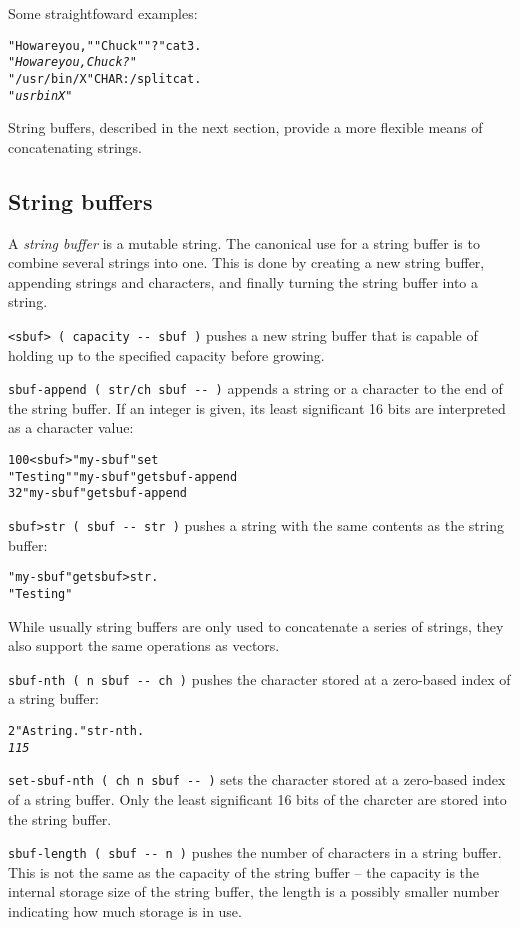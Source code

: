 \documentclass[english]{article}
\begin{document}
Some straightfoward examples:

\begin{alltt}
"How are you, " "Chuck" "?" cat3 .
\emph{"How are you, Chuck?"}
"/usr/bin/X" CHAR: / split cat .
\emph{"usrbinX"}
\end{alltt}
String buffers, described in the next section, provide a more flexible
means of concatenating strings.


\subsection{String buffers}

A \emph{string buffer} is a mutable string. The canonical use for
a string buffer is to combine several strings into one. This is done
by creating a new string buffer, appending strings and characters,
and finally turning the string buffer into a string.

\texttt{<sbuf> ( capacity -{}- sbuf )} pushes a new string buffer
that is capable of holding up to the specified capacity before growing.

\texttt{sbuf-append ( str/ch sbuf -{}- )} appends a string or a character
to the end of the string buffer. If an integer is given, its least significant
16 bits are interpreted as a character value:

\begin{alltt}
100 <sbuf> "my-sbuf" set
"Testing" "my-sbuf" get sbuf-append
32 "my-sbuf" get sbuf-append
\end{alltt}
\texttt{sbuf>str ( sbuf -{}- str )} pushes a string with the same
contents as the string buffer:

\begin{alltt}
"my-sbuf" get sbuf>str .
"Testing "
\end{alltt}
While usually string buffers are only used to concatenate a series
of strings, they also support the same operations as vectors.

\texttt{sbuf-nth ( n sbuf -{}- ch )} pushes the character stored at
a zero-based index of a string buffer:

\begin{alltt}
2 "A string." str-nth .
\emph{115}
\end{alltt}
\texttt{set-sbuf-nth ( ch n sbuf -{}- )} sets the character stored
at a zero-based index of a string buffer. Only the least significant
16 bits of the charcter are stored into the string buffer.

\texttt{sbuf-length ( sbuf -{}- n )} pushes the number of characters
in a string buffer. This is not the same as the capacity of the string
buffer -- the capacity is the internal storage size of the string
buffer, the length is a possibly smaller number indicating how much
storage is in use.
\end{document}
